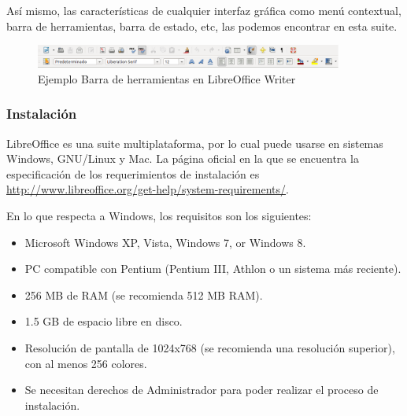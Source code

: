 \documentclass[12pt]{article}
\begin{document}
Así mismo, las características de cualquier interfaz gráfica como menú contextual, barra de herramientas, barra de estado, etc, las podemos encontrar en esta suite.

\begin{figure}[h]
\centering
\includegraphics[width=0.9\textwidth]{barraHerramientaLO.png}
\renewcommand{\figurename}{Fig.}
\caption{Ejemplo Barra de herramientas en LibreOffice Writer}
\label{contexto:figura}
\end{figure}
 
\subsubsection{Instalación}

LibreOffice es una suite multiplataforma, por lo cual puede usarse en sistemas Windows, GNU/Linux y Mac. La página oficial en la que se encuentra la especificación de los requerimientos de instalación es \url{http://www.libreoffice.org/get-help/system-requirements/}.

En lo que respecta a Windows, los requisitos son los siguientes:
\begin{itemize}
\item Microsoft Windows XP, Vista, Windows 7, or Windows 8.
\item PC compatible con Pentium (Pentium III, Athlon o un sistema más reciente).
\item 256 MB de RAM (se recomienda 512 MB RAM).
\item 1.5 GB de espacio libre en disco.
\item Resolución de pantalla de 1024x768 (se recomienda una resolución superior), con al menos 256 colores.
\item Se necesitan derechos de Administrador para poder realizar el proceso de instalación.
\end{itemize}
\end{document}
